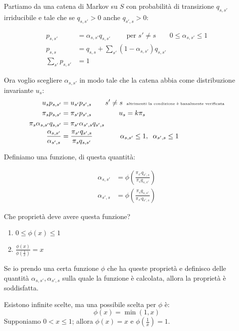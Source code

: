 \documentclass[a4paper,12pt]{book}
\newcommand\ddfrac[2]{\frac{\displaystyle #1}{\displaystyle #2}}
\begin{document}
Partiamo da una catena di Markov su $ S $ con probabilità di transizione $ q_{s,s'} $ irriducibile e tale che se $ q_{s,s'} > 0 $ anche $ q_{s',s} > 0 $:

\begin{align*}
	 p_{s,s'} & = \alpha_{s,s'}q_{s,s'} \qquad \text{ per } s' \ne s \qquad 0 \le \alpha_{s,s'} \le 1 \\
	 p_{s,s} & = q_{s,s} + \sum_{s'}(1 - \alpha_{s,s'})q_{s,s'} \\
	 \sum_{s'}p_{s,s'} & = 1
\end{align*}

Ora voglio scegliere $ \alpha_{s,s'} $ in modo tale che la catena abbia come distribuzione invariante $ u_s $:
\begin{align*}
	u_s p_{s,s'} & = u_{s'}p_{s',s} \qquad s' \ne s \; \; \text{\tiny altrimenti la condizione è banalmente verificata} \\
	\pi_s p_{s,s'} & = \pi_{s'}p_{s',s} \qquad \qquad u_s = k\pi_s \\
	\pi_s \alpha_{s,s'}q_{s,s'} & = \pi_{s'}\alpha_{s',s}q_{s',s} \\		
	\ddfrac{\alpha_{s,s'}}{\alpha_{s',s}} & = \ddfrac{\pi_{s'}q_{s',s}}{\pi_s q_{s,s'}} \qquad \qquad \alpha_{s,s'} \le 1 , \; \;  \alpha_{s',s} \le 1
\end{align*}

Definiamo una funzione, di questa quantità:

\begin{align*}
	\alpha_{s,s'} & = \phi \left(\ddfrac{\pi_{s'} q_{s',s}}{\pi_s q_{s,s'}}\right) \\
	\alpha_{s',s} & = \phi \left(\ddfrac{\pi_{s} q_{s,s'}}{\pi_{s'} q_{s',s}}\right) 
\end{align*}

Che proprietà deve avere questa funzione?

\begin{enumerate}
	\item $ 0 \le \phi(x) \le 1 $
	\item $ \ddfrac{\phi(x)}{\phi\left(\frac{1}{x}\right)} = x $
\end{enumerate}

Se io prendo una certa funzione $ \phi $ che ha queste proprietà e definisco delle quantità $ \alpha_{s,s'}, \alpha_{s',s} $ sulla quale la funzione è calcolata, allora la proprietà è soddisfatta. %

Esistono infinite scelte, ma una possibile scelta per $\phi$ è:
$$ \phi(x) = \min(1,x) $$
Supponiamo $ 0 < x \le 1 $; allora $ \phi(x) = x $ e $ \phi(\frac{1}{x}) = 1 $.
\end{document}
